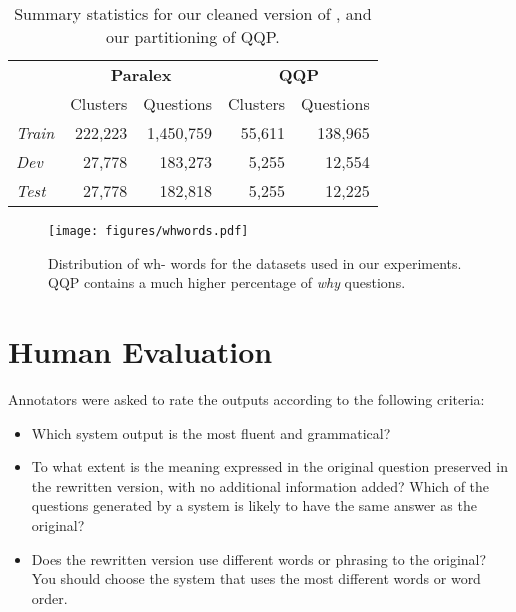 \documentclass[11pt,a4paper]{article}
\begin{document}
\begin{table}[ht]
    \centering
\small
    
    \begin{tabular}{l|rr|rr}
        & \multicolumn{2}{c}{\textbf{Paralex}} & \multicolumn{2}{c}{\textbf{QQP}} \\
        & Clusters & Questions & Clusters & Questions \\
        \hline
        \textit{Train} & 222,223 & 1,450,759 & 55,611 & 138,965  \\
        \textit{Dev} & 27,778 & 183,273 & 5,255 & 12,554 \\
        \textit{Test}  & 27,778 & 182,818 & 5,255 & 12,225
    \end{tabular}
    
    \caption{Summary statistics for our cleaned version of \cite{fader-etal-2013-paraphrase}, and our partitioning of QQP.}
    \label{tab:dataset}
\end{table}

\begin{figure}[ht]
    \centering
    \texttt{[image: figures/whwords.pdf]}
\vspace*{-.3cm}
    \caption{Distribution of wh- words for the datasets used in our experiments. QQP contains a much higher percentage of \textit{why} questions. }
    \label{fig:whwords}
\end{figure}

\section{Human Evaluation}
\label{app:humeval}

Annotators were asked to rate the outputs according to the following criteria:

\begin{itemize}
    \item Which system output is the most fluent and grammatical?
    \item To what extent is the meaning expressed in the original
      question preserved in the rewritten version, with no additional
      information added? Which of the questions generated by a system
      is likely to have the same answer as the original?
    \item Does the rewritten version use different words or phrasing to the original? You should choose the system that uses the most different words or word order.
\end{itemize}
\end{document}
